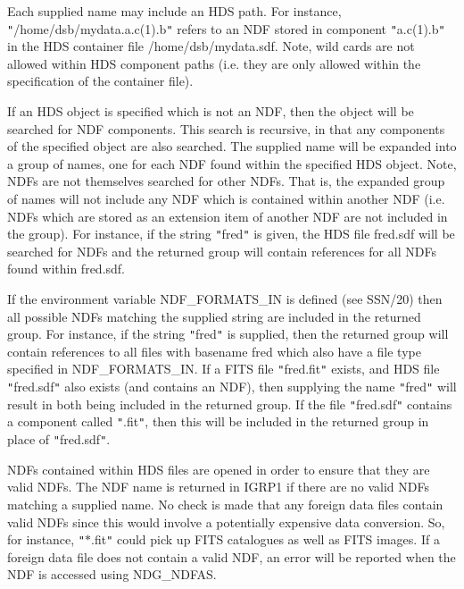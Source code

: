 \documentclass[twoside,11pt,nolof]{starlink}
\begin{document}
{{{         \sstitem
         Each supplied name may include an HDS path. For instance,
         \texttt{"}/home/dsb/mydata.a.c(1).b\texttt{"} refers to an NDF stored in component
         \texttt{"}a.c(1).b\texttt{"} in the HDS container file /home/dsb/mydata.sdf. Note,
         wild cards are not allowed within HDS component paths (i.e. they
         are only allowed within the specification of the container file).

         \sstitem
         If an HDS object is specified which is not an NDF, then the
         object will be searched for NDF components. This search is
         recursive, in that any components of the specified object are also
         searched. The supplied name will be expanded into a group of names,
         one for each NDF found within the specified HDS object. Note, NDFs
         are not themselves searched for other NDFs. That is, the expanded
         group of names will not include any NDF which is contained within
         another NDF (i.e. NDFs which are stored as an extension item of
         another NDF are not included in the group). For instance, if the
         string \texttt{"}fred\texttt{"} is given, the HDS file fred.sdf will be searched for
         NDFs and the returned group will contain references for all NDFs
         found within fred.sdf.

         \sstitem
         If the environment variable NDF\_FORMATS\_IN is defined (see
         SSN/20) then all possible NDFs matching the supplied string are
         included in the returned group. For instance, if the string \texttt{"}fred\texttt{"}
         is supplied, then the returned group will contain references to all
         files with basename fred which also have a file type specified in
         NDF\_FORMATS\_IN. If a FITS file \texttt{"}fred.fit\texttt{"} exists, and HDS file
         \texttt{"}fred.sdf\texttt{"} also exists (and contains an NDF), then supplying the
         name \texttt{"}fred\texttt{"} will result in both being included in the returned
         group. If the file \texttt{"}fred.sdf\texttt{"} contains a component called \texttt{"}.fit\texttt{"},
         then this will be included in the returned group in place of
         \texttt{"}fred.sdf\texttt{"}.

         \sstitem
         NDFs contained within HDS files are opened in order to ensure
         that they are valid NDFs. The NDF name is returned in IGRP1 if there
         are no valid NDFs matching a supplied name. No check is made that any
         foreign data files contain valid NDFs since this would involve a
         potentially expensive data conversion. So, for instance, \texttt{"}$*$.fit\texttt{"} could
         pick up FITS catalogues as well as FITS images. If a foreign data file
         does not contain a valid NDF, an error will be reported when the NDF
         is accessed using NDG\_NDFAS.

}}}
\end{document}
